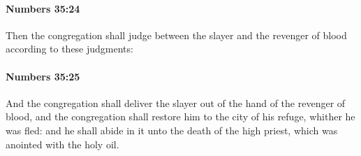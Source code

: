 		\paragraph{Numbers 35:24} %
			\label{NUMBERS-35-24}

			Then the congregation shall judge between the slayer and the revenger of blood according to these judgments:


		\paragraph{Numbers 35:25} %
			\label{NUMBERS-35-25}

			And the congregation shall deliver the slayer out of the hand of the revenger of blood, and the congregation shall restore him to the city of his refuge, whither he was fled: and he shall abide in it unto the death of the high priest, which was anointed with the holy oil.

